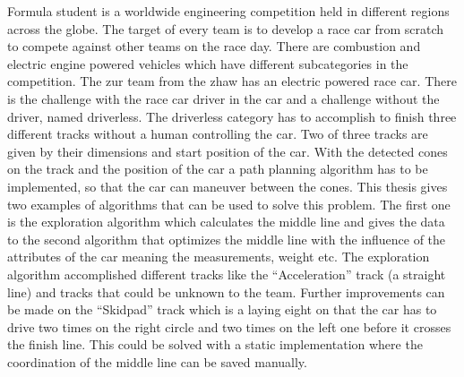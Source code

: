 Formula student is a worldwide engineering competition held in different regions across the globe. The target of every team is to develop a race car from scratch to compete against other teams on the race day. There are combustion and electric engine powered vehicles which have different subcategories in the competition. The \acrlong{zur} team from the \acrlong{zhaw} has an electric powered race car. There is the challenge with the race car driver in the car and a challenge without the driver, named driverless. The driverless category has to accomplish to finish three different tracks without a human controlling the car. Two of three tracks are given by their dimensions and start position of the car. With the detected cones on the track and the position of the car a path planning algorithm has to be implemented, so that the car can maneuver between the cones. This thesis gives two examples of algorithms that can be used to solve this problem. The first one is the exploration algorithm which calculates the middle line and gives the data to the second algorithm that optimizes the middle line with the influence of the attributes of the car meaning the measurements, weight etc. The exploration algorithm accomplished different tracks like the ``Acceleration'' track (a straight line) and tracks that could be unknown to the team. Further improvements can be made on the ``Skidpad'' track which is a laying eight on that the car has to drive two times on the right circle and two times on the left one before it crosses the finish line. This could be solved with a static implementation where the coordination of the middle line can be saved manually.
